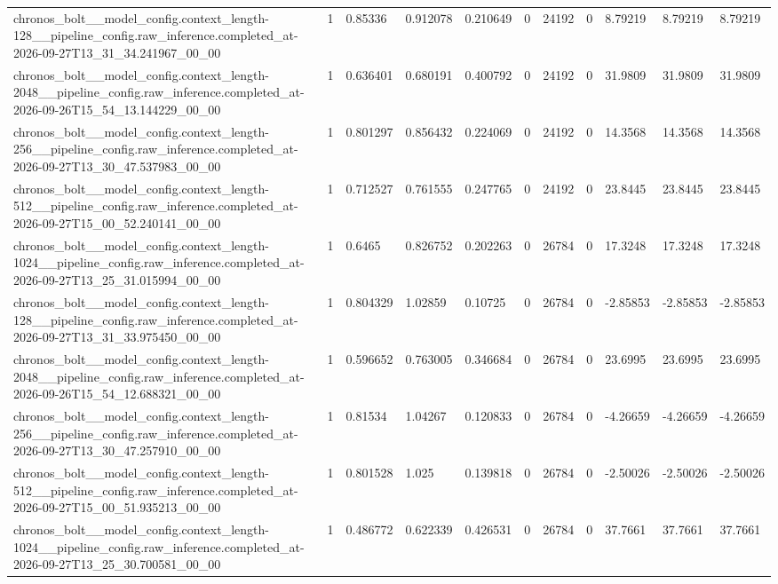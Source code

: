 \begin{tabular}{lllllllllll}
chronos\_bolt\_\_model\_config.context\_length-128\_\_pipeline\_config.raw\_inference.completed\_at-2026-09-27T13\_31\_34.241967\_00\_00 & 1 & 0.85336 & 0.912078 & 0.210649 & 0 & 24192 & 0 & 8.79219 & 8.79219 & 8.79219 \\
chronos\_bolt\_\_model\_config.context\_length-2048\_\_pipeline\_config.raw\_inference.completed\_at-2026-09-26T15\_54\_13.144229\_00\_00 & 1 & 0.636401 & 0.680191 & 0.400792 & 0 & 24192 & 0 & 31.9809 & 31.9809 & 31.9809 \\
chronos\_bolt\_\_model\_config.context\_length-256\_\_pipeline\_config.raw\_inference.completed\_at-2026-09-27T13\_30\_47.537983\_00\_00 & 1 & 0.801297 & 0.856432 & 0.224069 & 0 & 24192 & 0 & 14.3568 & 14.3568 & 14.3568 \\
chronos\_bolt\_\_model\_config.context\_length-512\_\_pipeline\_config.raw\_inference.completed\_at-2026-09-27T15\_00\_52.240141\_00\_00 & 1 & 0.712527 & 0.761555 & 0.247765 & 0 & 24192 & 0 & 23.8445 & 23.8445 & 23.8445 \\
chronos\_bolt\_\_model\_config.context\_length-1024\_\_pipeline\_config.raw\_inference.completed\_at-2026-09-27T13\_25\_31.015994\_00\_00 & 1 & 0.6465 & 0.826752 & 0.202263 & 0 & 26784 & 0 & 17.3248 & 17.3248 & 17.3248 \\
chronos\_bolt\_\_model\_config.context\_length-128\_\_pipeline\_config.raw\_inference.completed\_at-2026-09-27T13\_31\_33.975450\_00\_00 & 1 & 0.804329 & 1.02859 & 0.10725 & 0 & 26784 & 0 & -2.85853 & -2.85853 & -2.85853 \\
chronos\_bolt\_\_model\_config.context\_length-2048\_\_pipeline\_config.raw\_inference.completed\_at-2026-09-26T15\_54\_12.688321\_00\_00 & 1 & 0.596652 & 0.763005 & 0.346684 & 0 & 26784 & 0 & 23.6995 & 23.6995 & 23.6995 \\
chronos\_bolt\_\_model\_config.context\_length-256\_\_pipeline\_config.raw\_inference.completed\_at-2026-09-27T13\_30\_47.257910\_00\_00 & 1 & 0.81534 & 1.04267 & 0.120833 & 0 & 26784 & 0 & -4.26659 & -4.26659 & -4.26659 \\
chronos\_bolt\_\_model\_config.context\_length-512\_\_pipeline\_config.raw\_inference.completed\_at-2026-09-27T15\_00\_51.935213\_00\_00 & 1 & 0.801528 & 1.025 & 0.139818 & 0 & 26784 & 0 & -2.50026 & -2.50026 & -2.50026 \\
chronos\_bolt\_\_model\_config.context\_length-1024\_\_pipeline\_config.raw\_inference.completed\_at-2026-09-27T13\_25\_30.700581\_00\_00 & 1 & 0.486772 & 0.622339 & 0.426531 & 0 & 26784 & 0 & 37.7661 & 37.7661 & 37.7661 \\

\end{tabular}
